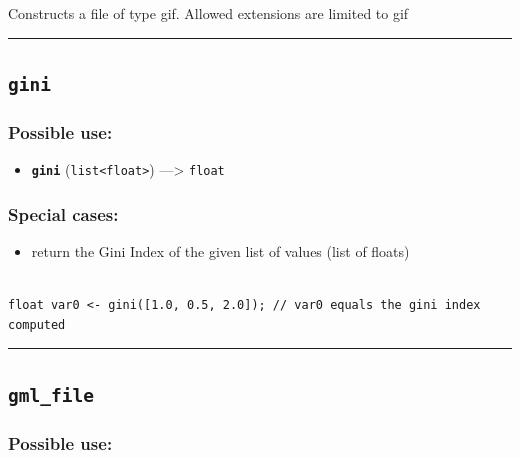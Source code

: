 \documentclass[]{book}
\providecommand{\tightlist}{%
  \setlength{\itemsep}{0pt}\setlength{\parskip}{0pt}}
\theoremstyle{definition}
\theoremstyle{definition}
\theoremstyle{definition}
\theoremstyle{remark}
\begin{document}
Constructs a file of type gif. Allowed extensions are limited to gif

\begin{center}\rule{0.5\linewidth}{\linethickness}\end{center}

\subsection{\texorpdfstring{\texttt{gini}}{gini}}\label{gini}

\subsubsection{Possible use:}\label{possible-use-237}

\begin{itemize}
\tightlist
\item
  \textbf{\texttt{gini}} (\texttt{list\textless{}float\textgreater{}})
  ---\textgreater{} \texttt{float}
\end{itemize}

\subsubsection{Special cases:}\label{special-cases-72}

\begin{itemize}
\tightlist
\item
  return the Gini Index of the given list of values (list of floats)
\end{itemize}

\begin{verbatim}
 
float var0 <- gini([1.0, 0.5, 2.0]); // var0 equals the gini index computed
\end{verbatim}

\begin{center}\rule{0.5\linewidth}{\linethickness}\end{center}

\subsection{\texorpdfstring{\texttt{gml\_file}}{gml\_file}}\label{gml_file}

\subsubsection{Possible use:}\label{possible-use-238}
\end{document}
